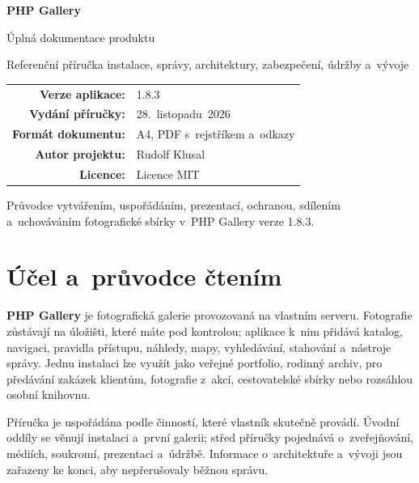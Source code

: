 \documentclass[11pt,a4paper]{article}
\newcommand{\version}{1.8.3}
\newcommand{\manualdate}{28.~listopadu~2026}
\newcommand{\product}{\textbf{PHP Gallery}}
\begin{document}
\begin{titlepage}
  \centering
  \vspace*{24mm}
  {\Huge\bfseries\color{GalleryBlue} PHP Gallery\par}
  \vspace{6mm}
  {\LARGE Úplná dokumentace produktu\par}
  \vspace{14mm}
  {\large Referenční příručka instalace, správy, architektury, zabezpečení,
  údržby a~vývoje\par}
  \vfill
  \begin{tabular}{rl}
    \textbf{Verze aplikace:} & \version\\
    \textbf{Vydání příručky:} & \manualdate\\
    \textbf{Formát dokumentu:} & A4, PDF s~rejstříkem a~odkazy\\
    \textbf{Autor projektu:} & Rudolf Klusal\\
    \textbf{Licence:} & Licence MIT\\
  \end{tabular}
  \vfill
  {\small Průvodce vytvářením, uspořádáním, prezentací, ochranou, sdílením
  a~uchováváním fotografické sbírky v~PHP Gallery verze \version.\par}
\end{titlepage}

\begingroup
\small
\setlength{\parskip}{0pt}
\tableofcontents
\endgroup
\clearpage
{}

\section{Účel a~průvodce čtením}

\product{} je fotografická galerie provozovaná na vlastním serveru. Fotografie
zůstávají na úložišti, které máte pod kontrolou; aplikace k~nim přidává katalog,
navigaci, pravidla přístupu, náhledy, mapy, vyhledávání, stahování a~nástroje
správy. Jednu instalaci lze využít jako veřejné portfolio, rodinný archiv, pro
předávání zakázek klientům, fotografie z~akcí, cestovatelské sbírky nebo
rozsáhlou osobní knihovnu.

Příručka je uspořádána podle činností, které vlastník skutečně provádí. Úvodní
oddíly se věnují instalaci a~první galerii; střed příručky pojednává
o~zveřejňování, médiích, soukromí, prezentaci a~údržbě. Informace o~architektuře
a~vývoji jsou zařazeny ke konci, aby nepřerušovaly běžnou správu.
\end{document}
